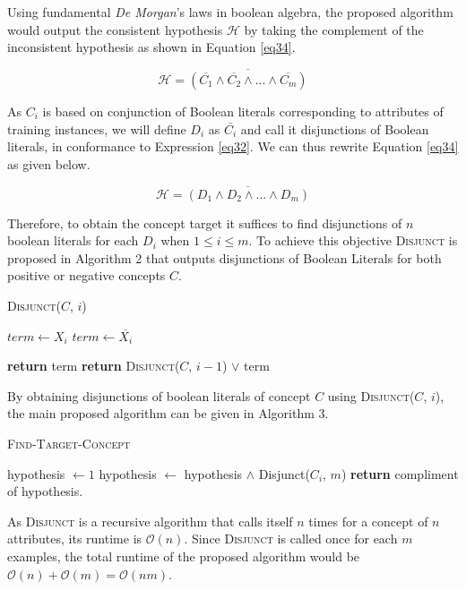 Using fundamental \textit{De Morgan}'s laws in boolean algebra, the proposed algorithm would output the consistent hypothesis $\mathcal{H}$ by taking the complement of the inconsistent hypothesis as shown in Equation \ref{eq34}.

\begin{equation}\label{eq34}
\mathcal{H} = \overline{(\overline{C_1}\wedge \overline{C_2} \wedge ... \wedge \overline{C_m})}
\end{equation}

As $C_i$ is based on conjunction of Boolean literals corresponding to attributes of training instances, we will define $D_i$ as $\bar{C_i}$ and call it disjunctions of Boolean literals, in conformance to Expression \ref{eq32}.
We can thus rewrite Equation \ref{eq34} as given below.

\begin{equation}\label{eq35}
\mathcal{H} = \overline{(D_1 \wedge D_2 \wedge ... \wedge D_m)}
\end{equation}

Therefore, to obtain the concept target it suffices to find disjunctions of $n$ boolean literals for each $D_i$ when $1 \leq i \leq m$.
To achieve this objective \textsc{Disjunct} is proposed in Algorithm 2 that outputs disjunctions of Boolean Literals for both positive or negative concepts $C$.

\begin{algorithm}[H]
\caption{\textsc{Disjunct}($C$, $i$)}
\begin{algorithmic}[1]
\State $term \leftarrow X_i$
\Else
\State $term \leftarrow \overline{X_i}$
\EndIf

\State \textbf{return} term
\Else
\State \textbf{return} \textsc{Disjunct}($C$, $i-1$) $\vee$ term
\EndIf
\end{algorithmic}
\end{algorithm}

By obtaining disjunctions of boolean literals of concept $C$ using \textsc{Disjunct}($C$, $i$), the main proposed algorithm can be given in Algorithm 3.

\begin{algorithm}[H]
\caption{\textsc{Find-Target-Concept}}
\begin{algorithmic}[1]
\State hypothesis $\leftarrow 1$
\State hypothesis $\leftarrow$ hypothesis $\wedge$ Disjunct($C_i$, $m$)
\EndFor
\State \textbf{return} compliment of hypothesis.
\end{algorithmic}
\end{algorithm}

As \textsc{Disjunct} is a recursive algorithm that calls itself $n$ times for a concept of $n$ attributes, its runtime is $\mathcal{O}(n)$.
Since \textsc{Disjunct} is called once for each $m$ examples, the total runtime of the proposed algorithm would be $\mathcal{O}(n) + \mathcal{O}(m) = \mathcal{O}(nm)$.
